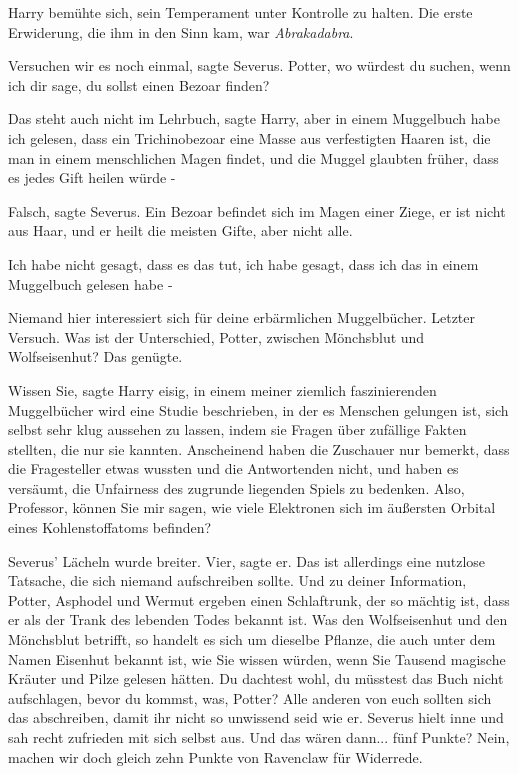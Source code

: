 Harry bemühte sich, sein Temperament unter Kontrolle zu halten. Die erste
Erwiderung, die ihm in den Sinn kam, war \glqq \emph{Abrakadabra}\grqq{}.

\glqq Versuchen wir es noch einmal\grqq{}, sagte Severus. \glqq Potter, wo
würdest du suchen, wenn ich dir sage, du sollst einen Bezoar finden?\grqq{}

\glqq Das steht auch nicht im Lehrbuch\grqq{}, sagte Harry, \glqq aber in einem
Muggelbuch habe ich gelesen, dass ein Trichinobezoar eine Masse aus verfestigten
Haaren ist, die man in einem menschlichen Magen findet, und die Muggel glaubten
früher, dass es jedes Gift heilen würde -\grqq{}

\glqq Falsch\grqq{}, sagte Severus. \glqq Ein Bezoar befindet sich im Magen
einer Ziege, er ist nicht aus Haar, und er heilt die meisten Gifte, aber nicht
alle.\grqq{}

\glqq Ich habe nicht gesagt, dass es das tut, ich habe gesagt, dass ich das in
einem Muggelbuch gelesen habe -\grqq{}

\glqq Niemand hier interessiert sich für deine erbärmlichen Muggelbücher.
Letzter Versuch. Was ist der Unterschied, Potter, zwischen Mönchsblut und
Wolfseisenhut?\grqq{} Das genügte.

\glqq Wissen Sie\grqq{}, sagte Harry eisig, \glqq in einem meiner ziemlich
faszinierenden Muggelbücher wird eine Studie beschrieben, in der es Menschen
gelungen ist, sich selbst sehr klug aussehen zu lassen, indem sie Fragen über
zufällige Fakten stellten, die nur sie kannten. Anscheinend haben die Zuschauer
nur bemerkt, dass die Fragesteller etwas wussten und die Antwortenden nicht, und
haben es versäumt, die Unfairness des zugrunde liegenden Spiels zu bedenken.
Also, Professor, können Sie mir sagen, wie viele Elektronen sich im äußersten
Orbital eines Kohlenstoffatoms befinden?\grqq{}

Severus' Lächeln wurde breiter. \glqq Vier\grqq{}, sagte er. \glqq Das ist
allerdings eine nutzlose Tatsache, die sich niemand aufschreiben sollte. Und zu
deiner Information, Potter, Asphodel und Wermut ergeben einen Schlaftrunk, der
so mächtig ist, dass er als der Trank des lebenden Todes bekannt ist. Was den
Wolfseisenhut und den Mönchsblut betrifft, so handelt es sich um dieselbe
Pflanze, die auch unter dem Namen Eisenhut bekannt ist, wie Sie wissen würden,
wenn Sie Tausend magische Kräuter und Pilze gelesen hätten. Du dachtest wohl, du
müsstest das Buch nicht aufschlagen, bevor du kommst, was, Potter? Alle anderen
von euch sollten sich das abschreiben, damit ihr nicht so unwissend seid wie
er.\grqq{} Severus hielt inne und sah recht zufrieden mit sich selbst aus. \glqq
Und das wären dann... fünf Punkte? Nein, machen wir doch gleich zehn Punkte von
Ravenclaw für Widerrede.\grqq{}

